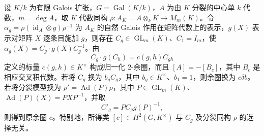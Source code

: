\begin{proposition}\label{b2:prop:split-algebra-factor-set}
	设 \(K/k\) 为有限 Galois 扩张，\(G=\operatorname{Gal}(K/k)\)，\(A\) 为由 \(K\) 分裂的中心单 \(k\) 代数，\(m=\deg A\)，取 \(K\) 代数同构 \(\rho:A_K=A\otimes_kK\rightarrow M_m(K)\)。令 \(\alpha_g=\rho(\operatorname{id}_A\otimes g)\rho^{-1}\) 为 \(A_K\) 的自然 Galois 作用在矩阵代数上的表示，\(g(X)\) 表示对矩阵 \(X\) 逐条目施加 \(g\)，则存在 \(C_g\in\operatorname{GL}_m(K)\)、\(C_1=I_m\)，使 \(\alpha_g(X)=C_g\cdot g(X)C_g^{-1}\)。由
	\[
		C_g\cdot g(C_h)=c(g,h)C_{gh}
	\]
	定义的标量 \(c(g,h)\in K^\times\) 构成归一化 \(2\)-余圈，而且 \([A]=-[B_c]\)，其中 \(B_c\) 是相应交叉积代数。若将 \(C_g\) 换为 \(b_gC_g\)，其中 \(b_g\in K^\times\)、\(b_1=1\)，则余圈换为 \(c\delta b\)。若将分裂模型换为 \(\rho'=\operatorname{Ad}(P)\rho\)，其中 \(P\in\operatorname{GL}_m(K)\)、\(\operatorname{Ad}(P)(X)=PXP^{-1}\)，并取
	\[
		C'_g=PC_g g(P)^{-1},
	\]
	则得到原余圈 \(c\)。特别地，所得类 \([c]\in H^2(G,K^\times)\) 与 \(C_g\) 及分裂同构 \(\rho\) 的选择无关。
\end{proposition}
